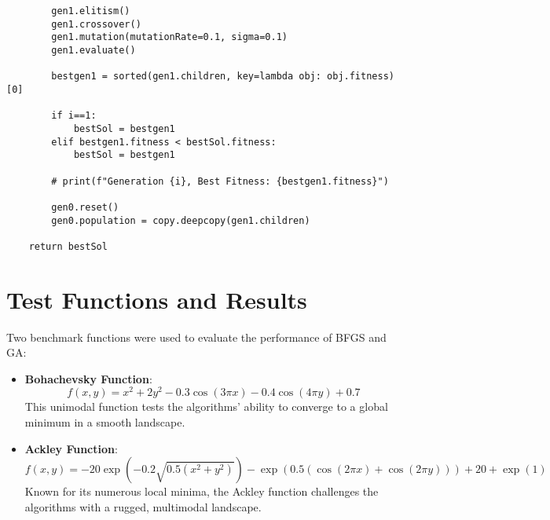 \documentclass[12pt,a4paper,oneside]{paper} %
\begin{document}
\begin{verbatim}
        gen1.elitism()
        gen1.crossover()
        gen1.mutation(mutationRate=0.1, sigma=0.1)
        gen1.evaluate()
        
        bestgen1 = sorted(gen1.children, key=lambda obj: obj.fitness)[0]
        
        if i==1:
            bestSol = bestgen1
        elif bestgen1.fitness < bestSol.fitness:
            bestSol = bestgen1

        # print(f"Generation {i}, Best Fitness: {bestgen1.fitness}")

        gen0.reset()
        gen0.population = copy.deepcopy(gen1.children)

    return bestSol
\end{verbatim}

\section{Test Functions and Results}

Two benchmark functions were used to evaluate the performance of BFGS and GA:

\begin{itemize}
    \item \textbf{Bohachevsky Function}: 
    \[
    f(x, y) = x^2 + 2y^2 - 0.3\cos(3\pi x) - 0.4\cos(4\pi y) + 0.7
    \]
    This unimodal function tests the algorithms' ability to converge to a global minimum in a smooth landscape.

    \item \textbf{Ackley Function}:
    \[
    f(x, y) = -20 \exp\left(-0.2 \sqrt{0.5(x^2 + y^2)}\right) - \exp\left(0.5(\cos(2\pi x) + \cos(2\pi y))\right) + 20 + \exp(1)
    \]
    Known for its numerous local minima, the Ackley function challenges the algorithms with a rugged, multimodal landscape.
\end{itemize}
\end{document}
